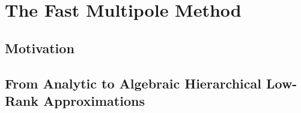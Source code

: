 \chapter{The Fast Multipole Method}\label{chpt:1}
% 

\section{Motivation}\label{sec:1_1_motivation}


\section{From Analytic to Algebraic Hierarchical Low-Rank Approximations}\label{sec:1_2}


